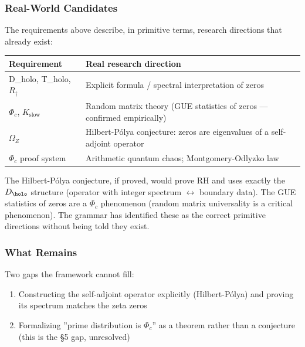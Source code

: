 \documentclass[12pt,a4paper]{article}
\newcommand{\pilcrow}{\S}
\begin{document}
\subsubsection{Real-World Candidates}

The requirements above describe, in primitive terms, research directions that already exist:

\begin{table}[htbp]
\centering
\small
{}
\begin{tabularx}{\textwidth}{>{\centering\arraybackslash}X >{\centering\arraybackslash}X}
\toprule
\rowcolor{gray!25}\textbf{Requirement} & \textbf{Real research direction} \\
\midrule
\rowcolors{1}{white}{gray!10}
D\_holo, T\_holo, $R_{\dagger}$ & Explicit formula / spectral interpretation of zeros \\
$\Phi_c$, $K_{\text{slow}}$ & Random matrix theory (GUE statistics of zeros --- confirmed empirically) \\
$\Omega_Z$ & Hilbert-Pólya conjecture: zeros are eigenvalues of a self-adjoint operator \\
$\Phi_c$ proof system & Arithmetic quantum chaos; Montgomery-Odlyzko law \\
\bottomrule
\end{tabularx}
\end{table}

The Hilbert-Pólya conjecture, if proved, would prove RH and uses exactly the $D_{\holo}$ structure (operator with integer spectrum $\leftrightarrow$ boundary data). The GUE statistics of zeros are a $\Phi_c$ phenomenon (random matrix universality is a critical phenomenon). The grammar has identified these as the correct primitive directions without being told they exist.

\subsubsection{What Remains}

Two gaps the framework cannot fill:

\begin{enumerate}
    \item Constructing the self-adjoint operator explicitly (Hilbert-Pólya) and proving its spectrum matches the zeta zeros
    \item Formalizing ''prime distribution is $\Phi_c$'' as a theorem rather than a conjecture (this is the \pilcrow{}5 gap, unresolved)
\end{enumerate}
\end{document}
